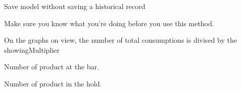 \documentclass[letterpaper,10pt,english]{sphinxmanual}
\begin{document}
\begin{fulllineitems}
\begin{fulllineitems}
\end{fulllineitems}


\begin{fulllineitems}
\label{\detokenize{modules/models:gestion.models.Product.save_without_historical_record}}
Save model without saving a historical record

Make sure you know what you’re doing before you use this method.

\end{fulllineitems}


\begin{fulllineitems}
\label{\detokenize{modules/models:gestion.models.Product.showingMultiplier}}
On the graphs on {\hyperref[\detokenize{modules/views:users.views.profile}]{}} view, the number of total consumptions is divised by the showingMultiplier

\end{fulllineitems}


\begin{fulllineitems}
\label{\detokenize{modules/models:gestion.models.Product.stockBar}}
Number of product at the bar.

\end{fulllineitems}


\begin{fulllineitems}
\label{\detokenize{modules/models:gestion.models.Product.stockHold}}
Number of product in the hold.

\end{fulllineitems}


\end{fulllineitems}
\end{document}
